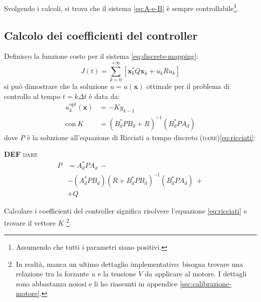 Svolgendo i calcoli, si trova che il sistema \eqref{eq:A-e-B} è sempre controllabile\footnote{Assumendo che tutti i
parametri siano positivi.}.

\subsection{Calcolo dei coefficienti del controller}\label{calcolo-coefficienti}
Definisco la funzione costo per il sistema \eqref{eq:discrete-mapping}:
\begin{equation}
  J(t) =
  \sum_{k=0}^{+\infty} \left[ \mathbf{x}_k^* Q \mathbf {x}_k + u_k R u_k \right]
  \label{eq:lqr-costo-discreto}
\end{equation}
si può dimostrare\cite{chow1975analysis} che la soluzione $u = u(\mathbf x)$ ottimale per il problema di controllo al tempo $t = k \Delta t$ è data da:
\begin{equation}
  \begin{aligned}
  u_k^{\text{opt}}(\mathbf x) &= -K y_{k-1} \\
  \text{con}\ K &= (B_d^*PB_d + R)^{-1}(B_d^*PA_d)
  \end{aligned}
  \label{eq:f-opt}
\end{equation}
dove $P$ è la soluzione all'equazione di Ricciati a tempo discreto (\textsc{dare})\eqref{eq:ricciati}:%
\begin{framed}
  \textbf{DEF} \textsc{dare}
  \begin{equation}
    \begin{aligned}
    P &=A_d^* P A_d\ - \\
     &-(A_d^* P B_d)(R + B_d^* P B_d)^{-1}(B_d^* P A_d)\ + \\
    &+ Q
    \end{aligned}
    \label{eq:ricciati}
  \end{equation}%
\end{framed}%
Calcolare i coefficienti del controller significa risolvere l'equazione \eqref{eq:ricciati} e trovare il vettore $K$
\footnote{In realtà, manca un ultimo dettaglio implementativo: bisogna trovare una relazione tra la forzante $u$ e
la tensione $V$ da applicare al motore. I dettagli sono abbastanza noiosi e li ho riassunti in appendice \ref{sec:calibrazione-motore}.}.

